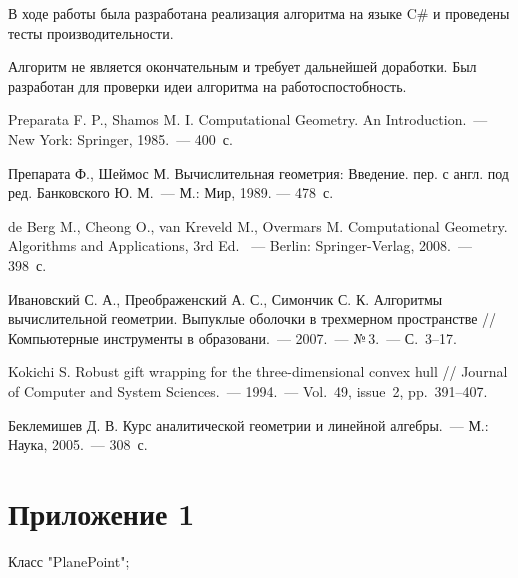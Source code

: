 \documentclass[14pt]{extarticle}
\begin{document}
В ходе работы была разработана реализация алгоритма на языке C\# и проведены тесты производительности.


Алгоритм не является окончательным и требует дальнейшей доработки.
Был разработан для проверки идеи алгоритма на работоспостобность.


\newpage

\newpage
{}
\begin{thebibliography}{9}
 Preparata F. P., Shamos M. I. Computational Geometry. An Introduction.~--- New York: Springer, 1985.~--- 400~с.

 Препарата Ф., Шеймос М. Вычислительная геометрия: Введение. пер. с англ. под ред. Банковского Ю. М.~--- М.: Мир, 1989. --- 478~с.

 de Berg M., Cheong O., van Kreveld M., Overmars M. Computational Geometry. Algorithms and Applications, 3rd Ed. ~--- Berlin: Springer-Verlag, 2008.~--- 398~с.

 Ивановский С. А., Преображенский А. С., Симончик С. К. Алгоритмы вычислительной геометрии. Выпуклые оболочки в трехмерном пространстве // Компьютерные инструменты в образовани.~--- 2007.~--- №\,3.~--- С.~3--17.

 Kokichi S. Robust gift wrapping for the three-dimensional convex hull // Journal of Computer and System Sciences.~--- 1994.~--- Vol.~49, issue~2, pp.~391--407.

 Беклемишев Д. В. Курс аналитической геометрии и линейной алгебры.~--- М.: Наука, 2005.~--- 308~с.
\end{thebibliography}
\newpage


\label{lastpage}
\section*{Приложение 1}
\label{add:PlanePoint}
Класс "PlanePoint";
\end{document}
